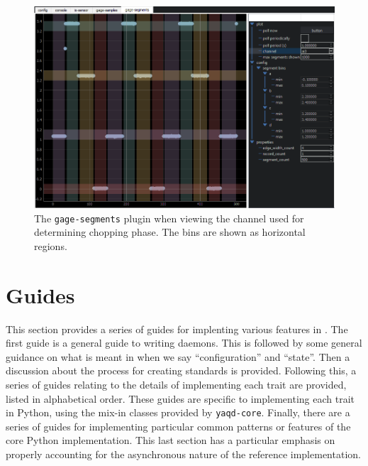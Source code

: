 \begin{landscape}
\begin{figure}
\includegraphics[width=8in]{"yaq/images/gage_segments_ai3"}
\caption[\yaqcqtpy{} Gage DAQ Plugin (chopping binning)]{
	The \texttt{gage-segments} plugin when viewing the channel used for determining chopping phase.
	The bins are shown as horizontal regions.
}
\label{yaq:fig:gage_segments_ai3}
\end{figure}
\end{landscape}





\clearpage

\section{Guides}

This section provides a series of guides for implenting various features in \yaq{}.
The first guide is a general guide to writing daemons.
This is followed by some general guidance on what is meant in \yaq{} when we say ``configuration'' and ``state''.
Then a discussion about the process for creating \yaq{} standards is provided.
Following this, a series of guides relating to the details of implementing each trait are provided, listed in alphabetical order.
These guides are specific to implementing each trait in Python, using the mix-in classes provided by \texttt{yaqd-core}.
Finally, there are a series of guides for implementing particular common patterns or features of the core Python implementation.
This last section has a particular emphasis on properly accounting for the asynchronous nature of the reference implementation.

